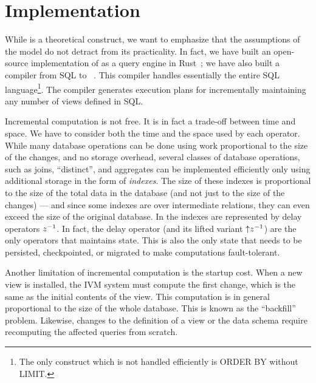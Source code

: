 \section{Implementation}\label{sec:implementation}


While \dbsp is a theoretical construct, we want to emphasize that the
assumptions of the model do not detract from its practicality.  In
fact, we have built an open-source implementation of \dbsp as a query
engine in Rust~\cite{dbsp-crate}; we have also built a compiler from
SQL to \dbsp~\cite{sql-to-dbsp-compiler}.  This compiler handles
essentially the entire SQL language\footnote{The only construct which
is not handled efficiently is ORDER BY without LIMIT.}.  The compiler
generates execution plans for incrementally maintaining any number of
views defined in SQL.

Incremental computation is not free.  It is in fact a trade-off
between time and space.  We have to consider both the time and the
space used by each operator.  While many database operations can be
done using work proportional to the size of the changes, and no
storage overhead, several classes of database operations, such as
joins, ``distinct'', and aggregates can be implemented efficiently
only using additional storage in the form of \emph{indexes}.  The size
of these indexes is proportional to the size of the total data in the
database (and not just to the size of the changes) --- and since some
indexes are over intermediate relations, they can even exceed the size
of the original database.  In \dbsp the indexes are represented by
delay operators $z^{-1}$.  In fact, the delay operator (and its lifted
variant ${\uparrow}z^{-1}$) are the only operators that maintains state.
This is also the only state that needs to be persisted, checkpointed,
or migrated to make \dbsp computations fault-tolerant.

Another limitation of incremental computation is the startup cost.
When a new view is installed, the IVM system must compute the first
change, which is the same as the initial contents of the view.  This
computation is in general proportional to the size of the whole
database.  This is known as the ``backfill'' problem.  Likewise,
changes to the definition of a view or the data schema require
recomputing the affected queries from scratch.

